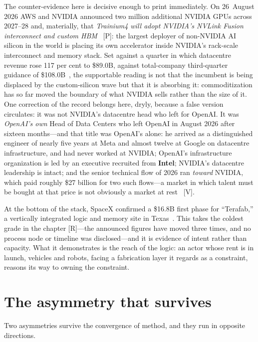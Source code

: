 The counter-evidence here is decisive enough to print immediately. On 26~August 2026 AWS and NVIDIA announced two million additional NVIDIA GPUs across 2027--28 and, materially, that \emph{Trainium4 will adopt NVIDIA's NVLink Fusion interconnect and custom HBM}~\cite{aws-nvda} [P]: the largest deployer of non-NVIDIA AI silicon in the world is placing its own accelerator inside NVIDIA's rack-scale interconnect and memory stack. Set against a quarter in which datacentre revenue rose 117 per cent to \$89.0B, against total-company third-quarter guidance of \$108.0B~\cite{nvda-q2fy27}, the supportable reading is not that the incumbent is being displaced by the custom-silicon wave but that it is absorbing it: commoditization has so far moved the boundary of what NVIDIA sells rather than the size of it. One correction of the record belongs here, dryly, because a false version circulates: it was not NVIDIA's datacentre head who left for OpenAI. It was \emph{OpenAI's own} Head of Data Centers who left OpenAI in August 2026 after sixteen months---and that title was OpenAI's alone: he arrived as a distinguished engineer of nearly five years at Meta and almost twelve at Google on datacentre infrastructure, and had never worked at NVIDIA; OpenAI's infrastructure organization is led by an executive recruited from \textbf{Intel}; NVIDIA's datacentre leadership is intact; and the senior technical flow of 2026 ran \emph{toward} NVIDIA, which paid roughly \$27 billion for two such flows---a market in which talent must be bought at that price is not obviously a market at rest~\cite{openai-exec,nvda-segments} [V].

At the bottom of the stack, SpaceX confirmed a \$16.8B first phase for ``Terafab,'' a vertically integrated logic and memory site in Texas~\cite{terafab}. This takes the coldest grade in the chapter [R]---the announced figures have moved three times, and no process node or timeline was disclosed---and it is evidence of intent rather than capacity. What it demonstrates is the reach of the logic: an actor whose rent is in launch, vehicles and robots, facing a fabrication layer it regards as a constraint, reasons its way to owning the constraint.

\section{The asymmetry that survives}

Two asymmetries survive the convergence of method, and they run in opposite directions.

